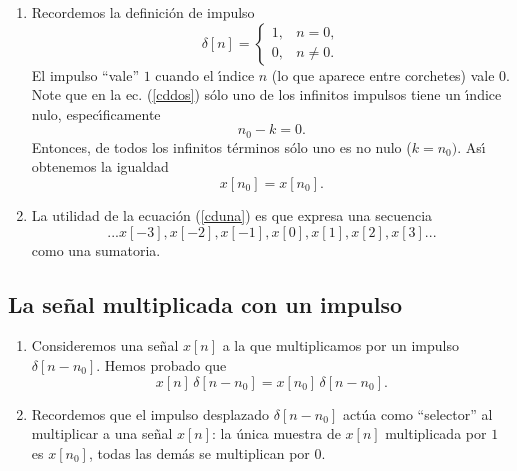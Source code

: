 \begin{enumerate}
\item Recordemos la definici\'{o}n de impulso
  \begin{equation}
    \delta \left[ n\right] =\left\{ 
      \begin{array}{cc}
        1, & n=0, \\ 
        0, & n\neq 0.
      \end{array}
    \right.
  \end{equation}
  El impulso ``vale'' $1$ cuando el \'{\i}ndice $n$ (lo que aparece
  entre corchetes) vale $0$. Note que en la ec. (\ref{cddos}) s\'{o}lo
  uno de los infinitos impulsos tiene un \'{\i}ndice nulo,
  espec\'{\i}ficamente
  \begin{equation}
    n_{0}-k=0.
  \end{equation}
  Entonces, de todos los infinitos t\'{e}rminos s\'{o}lo uno es no
  nulo ($k=n_{0})$.  As\'{\i} obtenemos la igualdad
  \begin{equation}
    x\left[ n_{0}\right] =x\left[ n_{0}\right] .
  \end{equation}

\item La utilidad de la ecuaci\'{o}n (\ref{cduna}) es que expresa una
  secuencia
  \begin{equation}
    ...x[-3],x[-2],x[-1],x[0],x[1],x[2],x[3]...
  \end{equation}
  como una sumatoria.

\end{enumerate}

\subsection{La se\~{n}al multiplicada con un impulso}

\begin{enumerate}
\item Consideremos una se\~{n}al $x\left[ n\right]$ a la que
  multiplicamos por un impulso $\delta\left[ n - n_{0}\right]$. 
Hemos probado que
\begin{equation}
x\left[ n\right] \, \delta\left[ n - n_{0}\right] = 
x\left[ n_{0}\right] \, \delta\left[ n - n_{0}\right].
\end{equation}

\item Recordemos que el impulso desplazado $\delta\left[ n - n_{0}\right]$
  act\'{u}a como ``selector'' al multiplicar a una se\~{n}al $x[n]$:
  la \'{u}nica muestra de $x[n]$ multiplicada por $1$ es $x[n_{0}]$,
  todas las dem\'{a}s se multiplican por $0$.

\end{enumerate}

